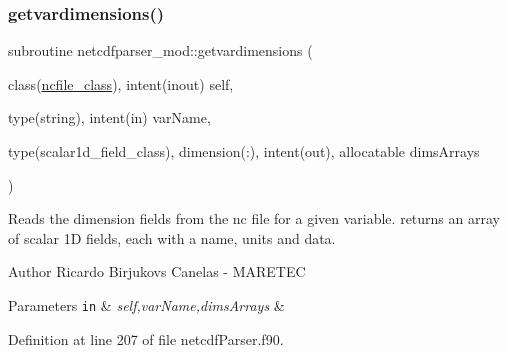 \subsubsection{\texorpdfstring{getvardimensions()}{getvardimensions()}}
{\footnotesize\ttfamily subroutine netcdfparser\+\_\+mod\+::getvardimensions (\begin{DoxyParamCaption}\item[{class(\mbox{\hyperlink{structnetcdfparser__mod_1_1ncfile__class}{ncfile\+\_\+class}}), intent(inout)}]{self,  }\item[{type(string), intent(in)}]{var\+Name,  }\item[{type(scalar1d\+\_\+field\+\_\+class), dimension(\+:), intent(out), allocatable}]{dims\+Arrays }\end{DoxyParamCaption})\hspace{0.3cm}{\ttfamily [private]}}



Reads the dimension fields from the nc file for a given variable. returns an array of scalar 1D fields, each with a name, units and data. 

\begin{DoxyAuthor}{Author}
Ricardo Birjukovs Canelas -\/ M\+A\+R\+E\+T\+EC 
\end{DoxyAuthor}

\begin{DoxyParams}[1]{Parameters}
\mbox{\tt in}  & {\em self,var\+Name,dims\+Arrays} & \\
\hline
\end{DoxyParams}


Definition at line 207 of file netcdf\+Parser.\+f90.


